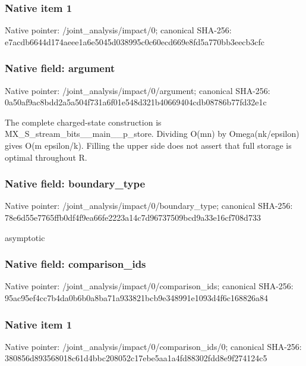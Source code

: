 \documentclass[10pt,a4paper]{article}
\begin{document}
\subsubsection{Native item 1}
Native pointer: /joint\_\allowbreak{}analysis/impact/0; canonical SHA-256: e7acdb6644d174aeee1a6e5045d038995c0c60ecd669e8fd5a770bb3eecb3cfc

\subsubsection{Native field: argument}
Native pointer: /joint\_\allowbreak{}analysis/impact/0/argument; canonical SHA-256: 0a50af9ac8bdd2a5a504f731a6f01e548d321b40669404cdb08786b77fd32e1c

\begingroup\raggedright\sloppy The complete charged-state construction is MX\_\allowbreak{}S\_\allowbreak{}stream\_\allowbreak{}bits\_\allowbreak{}\_\allowbreak{}main\_\allowbreak{}\_\allowbreak{}p\_\allowbreak{}store. Dividing O(mn) by Omega(nk/\allowbreak{}epsilon) gives O(m epsilon/\allowbreak{}k). Filling the upper side does not assert that full storage is optimal throughout R.\par\endgroup

\subsubsection{Native field: boundary\_\allowbreak{}type}
Native pointer: /joint\_\allowbreak{}analysis/impact/0/boundary\_\allowbreak{}type; canonical SHA-256: 78e6d55e7765ffb0df4f9ea66fe2223a14c7d96737509bcd9a33e16cf708d733

\begingroup\raggedright\sloppy asymptotic\par\endgroup

\subsubsection{Native field: comparison\_\allowbreak{}ids}
Native pointer: /joint\_\allowbreak{}analysis/impact/0/comparison\_\allowbreak{}ids; canonical SHA-256: 95ac95ef4cc7b4da0b6b0a8ba71a933821bcb9e348991e1093d4f6c168826a84

\subsubsection{Native item 1}
Native pointer: /joint\_\allowbreak{}analysis/impact/0/comparison\_\allowbreak{}ids/0; canonical SHA-256: 380856d893568018c61d4bbc208052c17ebe5aa1a4fd88302fdd8e9f274124c5
\end{document}
